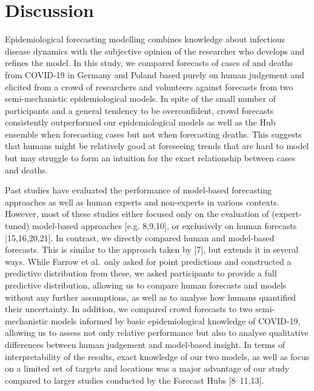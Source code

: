 \documentclass[10pt,letterpaper]{article}
\begin{document}
\hypertarget{discussion}{%
\section{Discussion}\label{discussion}}

Epidemiological forecasting modelling combines knowledge about
infectious disease dynamics with the subjective opinion of the
researcher who develops and refines the model. In this study, we
compared forecasts of cases of and deaths from COVID-19 in Germany and
Poland based purely on human judgement and elicited from a crowd of
researchers and volunteers against forecasts from two semi-mechanistic
epidemiological models. In spite of the small number of participants and
a general tendency to be overconfident, crowd forecasts consistently
outperformed our epidemiological models as well as the Hub ensemble when
forecasting cases but not when forecasting deaths. This suggests that
humans might be relatively good at foreseeing trends that are hard to
model but may struggle to form an intuition for the exact relationship
between cases and deaths.

Past studies have evaluated the performance of model-based forecasting
approaches as well as human experts and non-experts in various contexts.
However, most of these studies either focused only on the evaluation of
(expert-tuned) model-based approaches {[}e.g. 8,9,10{]}, or exclusively
on human forecasts {[}15,16,20,21{]}. In contrast, we directly compared
human and model-based forecasts. This is similar to the approach taken
by {[}7{]}, but extends it in several ways. While Farrow et al.~only
asked for point predictions and constructed a predictive distribution
from these, we asked participants to provide a full predictive
distribution, allowing us to compare human forecasts and models without
any further assumptions, as well as to analyse how humans quantified
their uncertainty. In addition, we compared crowd forecasts to two
semi-mechanistic models informed by basic epidemiological knowledge of
COVID-19, allowing us to assess not only relative performance but also
to analyse qualitative differences between human judgement and
model-based insight. In terms of interpretability of the results, exact
knowledge of our two models, as well as focus on a limited set of
targets and locations was a major advantage of our study compared to
larger studies conducted by the Forecast Hubs {[}8--11,13{]}.
\end{document}
